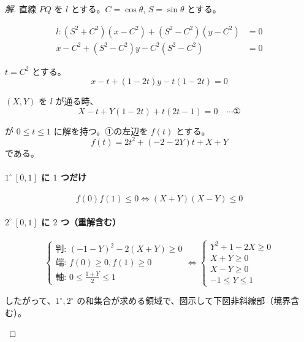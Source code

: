 \documentclass[../main.tex]{subfiles}
\begin{document}
\begin{proof}[解]
  直線 $PQ$ を $l$ とする。$C = \cos\theta$, $S = \sin\theta$ とする。

  \begin{align*}
    l : (S^2+C^2)(x-C^2) + (S^2-C^2)(y-C^2) &= 0 \\
    x-C^2 + (S^2-C^2)y - C^2(S^2-C^2) &= 0
  \end{align*}

  $t = C^2$ とする。
  \[
    x - t + (1-2t)y - t(1-2t) = 0
  \]

  $(X, Y)$ を $l$ が通る時、
  \begin{equation}
    X - t + Y(1-2t) + t(2t-1) = 0 \quad \cdots \text{①}
  \end{equation}

  が $0 \le t \le 1$ に解を持つ。①の左辺を $f(t)$ とする。
  \[
    f(t) = 2t^2 + (-2-2Y)t + X+Y
  \]
  である。

  \paragraph{$1^\circ \ [0, 1]$ に $1$ つだけ}
  \[
    f(0)f(1) \le 0 \iff (X+Y)(X-Y) \le 0
  \]

  \paragraph{$2^\circ \ [0, 1]$ に $2$ つ（重解含む）}
  \[
    \begin{cases}
      \text{判: } (-1-Y)^2 - 2(X+Y) \ge 0 \\
      \text{端: } f(0) \ge 0, f(1) \ge 0 \\
      \text{軸: } 0 \le \frac{1+Y}{2} \le 1
    \end{cases}
    \iff
    \begin{cases}
      Y^2+1-2X \ge 0 \\
      X+Y \ge 0 \\
      X-Y \ge 0 \\
      -1 \le Y \le 1
    \end{cases}
  \]

  したがって、$1^\circ, 2^\circ$ の和集合が求める領域で、図示して下図非斜線部（境界含む）。

  \begin{center}
\end{center}
\end{proof}
\end{document}

